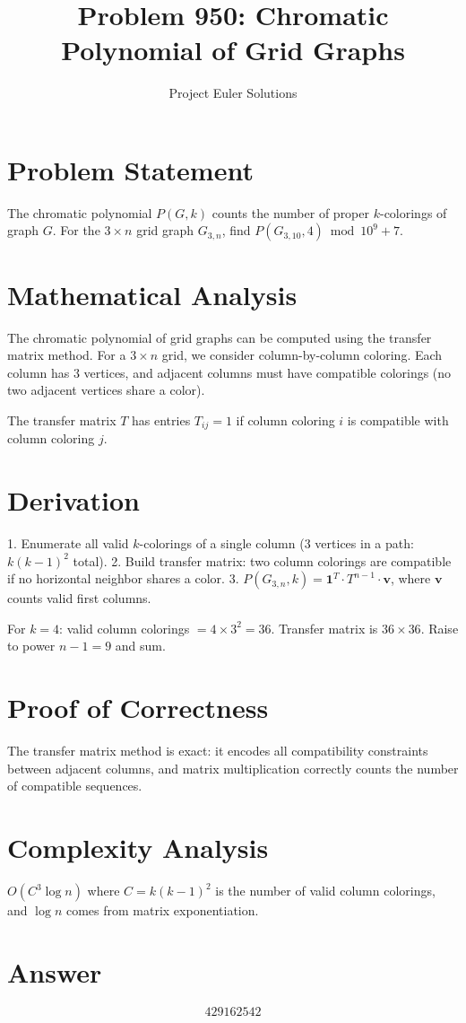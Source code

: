 \documentclass[11pt]{article}
\title{Problem 950: Chromatic Polynomial of Grid Graphs}
\author{Project Euler Solutions}
\date{}
\begin{document}
\maketitle

\section{Problem Statement}
The chromatic polynomial $P(G, k)$ counts the number of proper $k$-colorings of graph $G$. For the $3 \times n$ grid graph $G_{3,n}$, find $P(G_{3,10}, 4) \bmod 10^9+7$.

\section{Mathematical Analysis}
The chromatic polynomial of grid graphs can be computed using the transfer matrix method. For a $3 \times n$ grid, we consider column-by-column coloring. Each column has 3 vertices, and adjacent columns must have compatible colorings (no two adjacent vertices share a color).

The transfer matrix $T$ has entries $T_{ij} = 1$ if column coloring $i$ is compatible with column coloring $j$.

\section{Derivation}
1. Enumerate all valid $k$-colorings of a single column (3 vertices in a path: $k(k-1)^2$ total).
2. Build transfer matrix: two column colorings are compatible if no horizontal neighbor shares a color.
3. $P(G_{3,n}, k) = \mathbf{1}^T \cdot T^{n-1} \cdot \mathbf{v}$, where $\mathbf{v}$ counts valid first columns.

For $k=4$: valid column colorings $= 4 \times 3^2 = 36$. Transfer matrix is $36 \times 36$. Raise to power $n-1=9$ and sum.

\section{Proof of Correctness}
The transfer matrix method is exact: it encodes all compatibility constraints between adjacent columns, and matrix multiplication correctly counts the number of compatible sequences.

\section{Complexity Analysis}
$O(C^3 \log n)$ where $C = k(k-1)^2$ is the number of valid column colorings, and $\log n$ comes from matrix exponentiation.

\section{Answer}

\[
\boxed{429162542}
\]
\end{document}
